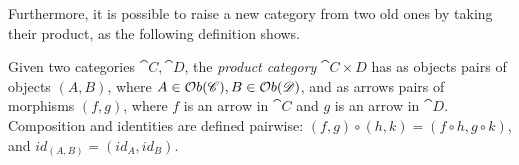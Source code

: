 Furthermore, it is possible to raise a new category from two old ones by taking their product, as the following definition shows.

\begin{definition}
    Given two categories $\cat C, \cat D$, the \emph{product category} $\cat{C\times D}$ has as objects pairs of objects $(A, B)$, where $A \in \mathcal{O}b(\mathscr{C}), B \in \mathcal{O}b(\mathscr{D})$, and as arrows pairs of morphisms $(f, g)$, where $f$ is an arrow in $\cat C$ and $g$ is an arrow in $\cat D$. Composition and identities are defined pairwise: $(f, g) \circ (h, k) = (f \circ h, g \circ k)$, and $id_{(A, B)} = (id_A, id_B)$.
\end{definition}

